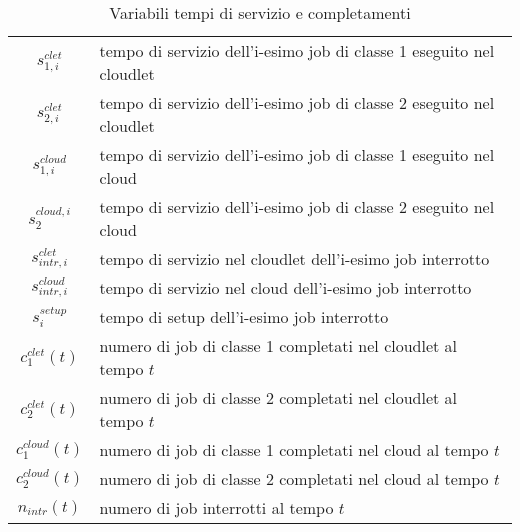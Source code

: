 \begin{table}[!h]
\begin{tabular}{c|l}
{$s_{1,i}^{clet}$}     & tempo di servizio dell’i-esimo job di classe 1 eseguito
nel cloudlet \\[2pt]
{$s_{2,i}^{clet}$}     & tempo di servizio dell’i-esimo job di classe 2 eseguito
nel cloudlet \\[2pt]
{$s_{1,i}^{cloud}$}    & tempo di servizio dell’i-esimo job di classe 1 eseguito
nel cloud \\[2pt]
{$s_2^{cloud,i}$}      & tempo di servizio dell’i-esimo job di classe 2 eseguito
nel cloud \\[2pt]
{$s_{intr,i}^{clet}$}  & tempo di servizio nel cloudlet dell’i-esimo job
interrotto \\[2pt]
{$s_{intr,i}^{cloud}$} & tempo di servizio nel cloud dell’i-esimo job interrotto
\\[2pt]
{$s_i^{setup}$}        & tempo di setup dell’i-esimo job interrotto \\[2pt]
{$c_1^{clet}(t)$}      & numero di job di classe 1 completati nel cloudlet al
tempo $t$ \\[2pt]
{$c_2^{clet}(t)$}      & numero di job di classe 2 completati nel cloudlet al
tempo $t$ \\[2pt] 
{$c_1^{cloud}(t)$}     & numero di job di classe 1 completati nel cloud al tempo
$t$ \\[2pt] 
{$c_2^{cloud}(t)$}     & numero di job di classe 2 completati nel cloud al tempo
$t$ \\[2pt]
{$n_{intr}(t)$}        & numero di job interrotti al tempo $t$ \\
\end{tabular}
\centering
\caption{Variabili tempi di servizio e completamenti}
\label{vars}
\end{table}
%
%
